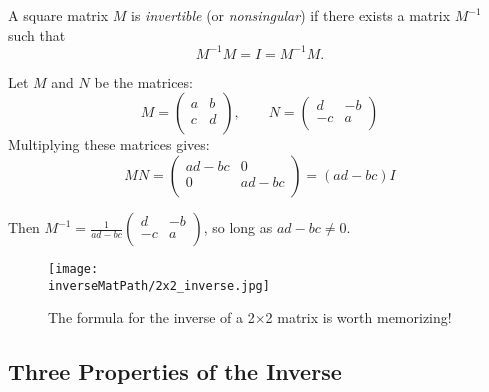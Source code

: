 \chapter{\inverseMatTitle}
\label{inverse_matrix}


\begin{definition}
A square matrix $M$ is \emph{invertible} (or \emph{nonsingular}) if there exists a matrix $M^{-1}$ such that
\[
M^{-1}M=I=M^{-1}M.
\]
\end{definition}



\begin{remark} Let $M$ and $N$ be the matrices:
\[
M=\begin{pmatrix}
a & b \\
c & d \\
\end{pmatrix},\qquad N=\begin{pmatrix}
d & -b \\
-c & a \\
\end{pmatrix}
\]
Multiplying these matrices gives:
\[
MN=\begin{pmatrix}
ad-bc & 0 \\
0 & ad-bc \\
\end{pmatrix}=(ad-bc)I
\]

Then $M^{-1}=\frac{1}{ad-bc}\begin{pmatrix}
d & -b \\
-c & a \\
\end{pmatrix}$, so long as $ad-bc\neq 0$.    
\end{remark}

\begin{figure}
\begin{center}
\texttt{[image: \\inverseMatPath/2x2\_inverse.jpg]}
\end{center}
\caption{The formula for the inverse of a 2$\times$2 matrix is worth memorizing!}
\end{figure}



\section{Three Properties of the Inverse}

